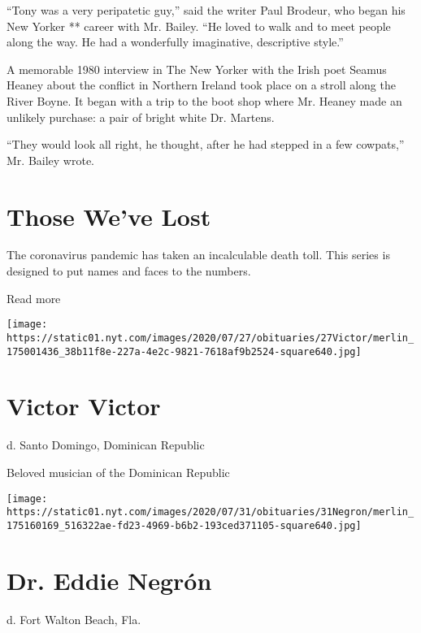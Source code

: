 ``Tony was a very peripatetic guy,'' said the writer Paul Brodeur, who
began his New Yorker ** career with Mr. Bailey. ``He loved to walk and
to meet people along the way. He had a wonderfully imaginative,
descriptive style.''

A memorable 1980 interview in The New Yorker with the Irish poet Seamus
Heaney about the conflict in Northern Ireland took place on a stroll
along the River Boyne. It began with a trip to the boot shop where Mr.
Heaney made an unlikely purchase: a pair of bright white Dr. Martens.

``They would look all right, he thought, after he had stepped in a few
cowpats,'' Mr. Bailey wrote.

\href{https://www.nytimes.com/interactive/2020/obituaries/people-died-coronavirus-obituaries.html?action=click\&pgtype=Article\&state=default\&region=BELOW_MAIN_CONTENT\&context=covid_obits_promo}{}

\hypertarget{those-weve-lost}{%
\section{Those We've Lost}\label{those-weve-lost}}

The coronavirus pandemic has taken an incalculable death toll. This
series is designed to put names and faces to the numbers.

Read more

\texttt{[image: https://static01.nyt.com/images/2020/07/27/obituaries/27Victor/merlin\_175001436\_38b11f8e-227a-4e2c-9821-7618af9b2524-square640.jpg]}

\hypertarget{victor-victor}{%
\section{Victor Victor}\label{victor-victor}}

d. Santo Domingo, Dominican Republic

Beloved musician of the Dominican Republic

\texttt{[image: https://static01.nyt.com/images/2020/07/31/obituaries/31Negron/merlin\_175160169\_516322ae-fd23-4969-b6b2-193ced371105-square640.jpg]}

\hypertarget{dr-eddie-negruxf3n}{%
\section{Dr. Eddie Negrón}\label{dr-eddie-negruxf3n}}

d. Fort Walton Beach, Fla.

